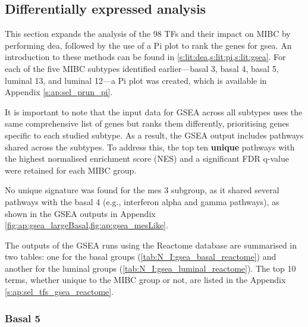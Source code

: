 \subsection{Differentially expressed analysis} \label{s:N_I:sel_tfs_subtypes}

This section expands the analysis of the 98 TFs and their impact on MIBC by performing \acrfull{dea}, followed by the use of a Pi plot to rank the genes for \acrfull{gsea}. An introduction to these methods can be found in \cref{s:lit:dea,s:lit:pi,s:lit:gsea}. For each of the five MIBC subtypes identified earlier—basal 3, basal 4, basal 5, luminal 13, and luminal 12—a Pi plot was created, which is available in Appendix \cref{s:ap:sel_prun_pi}. 

It is important to note that the input data for GSEA across all subtypes uses the same comprehensive list of genes but ranks them differently, prioritising genes specific to each studied subtype. As a result, the GSEA output includes pathways shared across the subtypes. To address this, the top ten \textbf{unique} pathways with the highest normalised enrichment score (NES) and a significant FDR q-value were retained for each MIBC group.

No unique signature was found for the mes 3 subgroup, as it shared several pathways with the basal 4 (e.g., interferon alpha and gamma pathways), as shown in the GSEA outputs in Appendix \cref{fig:ap:gsea_largeBasal,fig:ap:gsea_mesLike}.

The outputs of the GSEA runs using the Reactome database are summarised in two tables: one for the basal groups (\cref{tab:N_I:gsea_basal_reactome}) and another for the luminal groups (\cref{tab:N_I:gsea_luminal_reactome}). The top 10 terms, whether unique to the MIBC group or not, are listed in the Appendix \cref{s:ap:sel_tfs_gsea_reactome}.


\subsubsection*{Basal 5}


